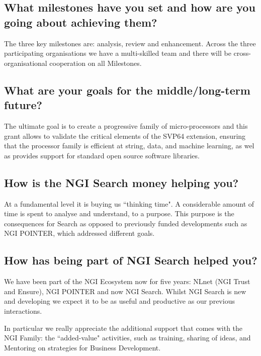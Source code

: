 \subsection{What milestones have you set and how are you going about achieving them?}

The three key milestones are: analysis, review and enhancement.
Across the three participating organisations we have a multi-skilled
team and there will be cross-organisational cooperation on all Milestones.

\subsection{What are your goals for the middle/long-term future?}

The ultimate goal is to create a progressive family of micro-processors
and this grant allows to validate the critical elements of the
\acrshort{SVP64} extension, ensuring that the processor family is efficient at string,
data, and machine learning, as wel as provides support for standard open
source software libraries.

\subsection{How is the \acrshort{NGI} Search money helping you?}

At a fundamental level it is buying us ``thinking time".
A considerable amount of time is spent to analyse and understand,
to a purpose. This purpose is the consequences for Search as
opposed to previously funded developments such as \acrshort{NGI} POINTER,
which addressed different goals.

\subsection{How has being part of \acrshort{NGI} Search helped you?}

We have been part of the \acrshort{NGI} Ecosystem now for five years:
NLnet (\acrshort{NGI} Trust and Ensure), \acrshort{NGI} POINTER and now \acrshort{NGI} Search.
Whilst \acrshort{NGI} Search is new and developing we expect it to be as
useful and productive as our previous interactions.

In particular we really appreciate the additional support that
comes with the \acrshort{NGI} Family: the ``added-value" activities, such
as training, sharing of ideas, and Mentoring on strategies for
Business Development.

